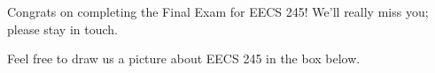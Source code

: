 \documentclass[11pt]{article}
\begin{document}
Congrats on completing the Final Exam for EECS 245! We'll really miss you; please stay in touch.

Feel free to draw us a picture about EECS 245 in the box below. 

\emptybox{13cm}



\end{document}
